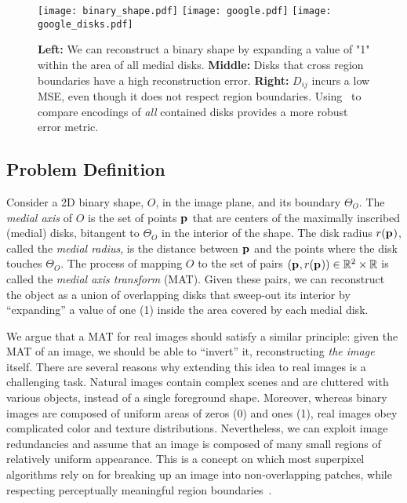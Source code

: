 \documentclass[10pt,twocolumn,letterpaper]{article}
\begin{document}
\begin{figure*}[t]
\centering
\texttt{[image: binary\_shape.pdf]}
\texttt{[image: google.pdf]}\hfill
\texttt{[image: google\_disks.pdf]}
\caption{\textbf{Left:} We can reconstruct a binary shape by expanding a value of "1" within the area of all medial disks.
\textbf{Middle:} Disks that cross region boundaries have a high reconstruction error.
\textbf{Right:} $D_{ij}$ incurs a low MSE, even though it does not respect region boundaries.
Using~ to compare encodings of \emph{all} contained disks provides a more robust error metric.}
\label{fig:google}
\end{figure*}

\subsection{Problem Definition}\label{sec:method:definition}
Consider a 2D binary shape, $O$, in the image plane, and its boundary $\Theta_O$.
The \emph{medial axis} of $O$ is the set of points $\mathbf{p}_{}$ that
are centers of the maximally inscribed (medial) disks, bitangent to $\Theta_O$
in the interior of the shape. The disk radius $r(\mathbf{p}_{})$, called the \emph{medial radius}, 
is the distance between $\mathbf{p}_{}$ and the points where the disk touches $\Theta_O$.
The process of mapping $O$ to the set of pairs $(\mathbf{p}_{},r(\mathbf{p}_{})) \in \mathbb{R}^2 \times \mathbb{R}$
is called the \emph{medial axis transform} (MAT).
Given these pairs, we can reconstruct the object as a union of overlapping disks that sweep-out 
its interior by ``expanding'' a value of one (1) inside the area covered by each  medial disk.

We argue that a MAT for real images should satisfy a similar principle: given the MAT of an image, 
we should be able to ``invert'' it, reconstructing \emph{the image} itself.
There are several reasons why extending this idea to real images is a challenging task. 
Natural images contain complex scenes and are cluttered with various objects, instead of a single foreground shape.
Moreover, whereas binary images are composed of uniform areas of zeros (0) and ones (1), 
real images obey complicated color and texture distributions.
Nevertheless, we can exploit image redundancies and assume that an image is composed of many small regions of 
relatively uniform appearance.
This is a concept on which most superpixel algorithms rely on for breaking up an image 
into non-overlapping patches, while respecting perceptually meaningful region 
boundaries~\cite{shi2000normalized,levinshtein2009turbopixels,achanta2012slic}. 
\end{document}
